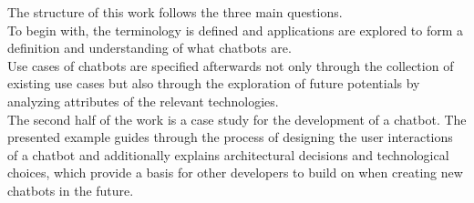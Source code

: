 The structure of this work follows the three main questions.
\\
To begin with, the terminology is defined and applications are explored to form a definition and understanding of what chatbots are.
\\
Use cases of chatbots are specified afterwards not only through the collection of existing use cases but also through the exploration of future potentials by analyzing attributes of the relevant technologies.
\\
The second half of the work is a case study for the development of a chatbot.
The presented example guides through the process of designing the user interactions of a chatbot and additionally explains architectural decisions and technological choices, which provide a basis for other developers to build on when creating new chatbots in the future.
